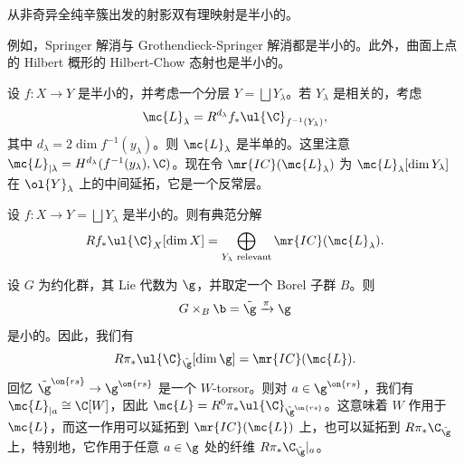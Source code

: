 \begin{thm}
    从非奇异全纯辛簇出发的射影双有理映射是半小的。
\end{thm}

\begin{exm}
    例如，Springer 解消与 Grothendieck-Springer 解消都是半小的。此外，曲面上点的 Hilbert 概形的 Hilbert-Chow 态射也是半小的。
\end{exm}

设 \(f \colon X \to Y\) 是半小的，并考虑一个分层 \(Y = \bigsqcup Y_{\lambda}\)。若 \(Y_{\lambda}\) 是相关的，考虑
\[ \mc{L}_{\lambda} = R^{d_{\lambda}} f_* \ul{\C}_{f^{-1}(Y_{\lambda})}, \]
其中 \(d_{\lambda} = 2 \dim f^{-1} (y_{\lambda})\)。则 \(\mc{L}_{\lambda}\) 是半单的。这里注意 \(\mc{L}_{|\lambda} = H^{d_{\lambda}}(f^{-1}(y_{\lambda}), \C)\)。现在令 \(\mr{IC}(\mc{L}_{\lambda})\) 为 \(\mc{L}_{\lambda}[\dim Y_{\lambda}]\) 在 \(\ol{Y}_{\lambda}\) 上的中间延拓，它是一个反常层。

\begin{thm}
    设 \(f \colon X \to Y = \bigsqcup Y_{\lambda}\) 是半小的。则有典范分解
    \[ R f_* \ul{\C}_X[\dim X] = \bigoplus_{Y_{\lambda}\text{ relevant}} \mr{IC}(\mc{L}_{\lambda}). \]
\end{thm}

\begin{exm}
    设 \(G\) 为约化群，其 Lie 代数为 \(\g\)，并取定一个 Borel 子群 \(B\)。则
    \[ G \times_B \b = \tilde{\g} \xrightarrow{\pi} \g \]
    是小的。因此，我们有
    \[ R \pi_* \ul{\C}_{\tilde{\g}} [\dim \g] = \mr{IC}(\mc{L}). \]
    回忆 \(\tilde{\g}^{\on{rs}} \to \g^{\on{rs}}\) 是一个 \(W\)-torsor。则对 \(a \in \g^{\on{rs}}\)，我们有 \(\mc{L}_{|a} \cong \C[W]\)，因此 \(\mc{L} = R^0 \pi_* \ul{\C}_{\tilde{\g}^{\on{rs}}}\)。这意味着 \(W\) 作用于 \(\mc{L}\)，而这一作用可以延拓到 \(\mr{IC}(\mc{L})\) 上，也可以延拓到 \(R \pi_* \C_{\tilde{\g}}\) 上，特别地，它作用于任意 \(a \in \g\) 处的纤维 \(R \pi_* \C_{\tilde{\g}}|_a\)。
\end{exm}

